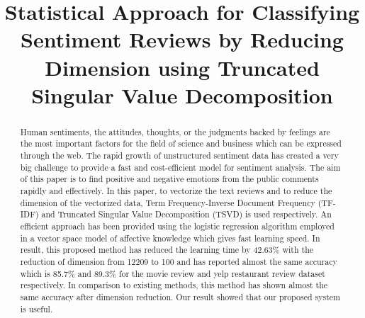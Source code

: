 \documentclass[10pt, conference]{IEEEtran}
\newcommand\AtPageUpperMyright[1]{\AtPageUpperLeft{%
		\put(\LenToUnit{0.08\paperwidth},\LenToUnit{-1cm}){%
			\parbox{\textwidth}{\raggedleft\fontsize{10}{11}\selectfont #1}}%
}}%
\newcommand{\conf}[1]{%
	\AddToShipoutPictureBG*{%
		\AtPageUpperMyright{#1}
	}
}
\begin{document}
	
	\title{Statistical Approach for Classifying Sentiment Reviews by Reducing Dimension using Truncated Singular Value Decomposition
	}
	\author{
		\and
		\and
	}
	\maketitle

	\begin{abstract} Human sentiments, the attitudes, thoughts, or the judgments backed by feelings are the most important factors for the field of science and business which can be expressed through the web. The rapid growth of unstructured sentiment data has created a very big challenge to provide a fast and cost-efficient model for sentiment analysis.  The aim of this paper is to find positive and negative emotions from the public comments rapidly and effectively. In this paper,  to vectorize the text reviews and to reduce the dimension of the vectorized data, Term Frequency-Inverse Document Frequency (TF-IDF) and Truncated Singular Value Decomposition (TSVD) is used respectively. An efficient approach has been provided using the logistic regression algorithm employed in a vector space model of affective knowledge which gives fast learning speed. In result, this proposed method has reduced the learning time by 42.63\% with the reduction of dimension from 12209 to 100 and has reported almost the same accuracy which is 85.7\%  and 89.3\% for the movie review and yelp restaurant review dataset respectively. In comparison to existing methods, this method has shown almost the same accuracy after dimension reduction. Our result showed that our proposed system is useful.
	\end{abstract}
	
\end{document}
